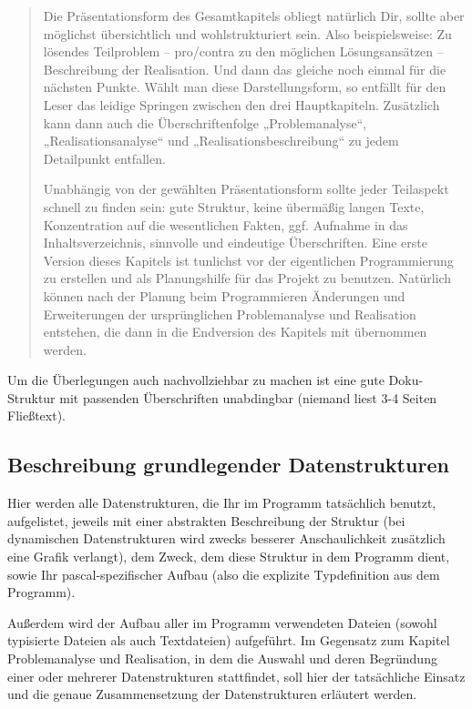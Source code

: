 \documentclass[12pt, letterpaper, twoside]{article}
\begin{document}
\begin{verse}
                    \item Die Präsentationsform des Gesamtkapitels obliegt natürlich Dir, sollte aber möglichst übersichtlich und wohlstrukturiert sein. Also beispielsweise: Zu lösendes Teilproblem – pro/contra zu den möglichen Lösungsansätzen – Beschreibung der Realisation. Und dann das gleiche noch einmal für die nächsten Punkte. Wählt man diese Darstellungsform, so entfällt für den Leser das leidige Springen zwischen den drei Hauptkapiteln. Zusätzlich kann dann auch die Überschriftenfolge „Problemanalyse“, „Realisationsanalyse“ und „Realisationsbeschreibung“ zu jedem Detailpunkt entfallen.

                    \item Unabhängig von der gewählten Präsentationsform sollte jeder Teilaspekt schnell zu finden sein: gute Struktur, keine übermäßig langen Texte, Konzentration auf die wesentlichen Fakten, ggf. Aufnahme in das Inhaltsverzeichnis, sinnvolle und eindeutige Überschriften. Eine erste Version dieses Kapitels ist tunlichst vor der eigentlichen Programmierung zu erstellen und als Planungshilfe für das Projekt zu benutzen. Natürlich können nach der Planung beim Programmieren Änderungen und Erweiterungen der ursprünglichen Problemanalyse und Realisation entstehen, die dann in die Endversion des Kapitels mit übernommen werden.
            \end{verse}
            Um die Überlegungen auch nachvollziehbar zu machen ist eine gute Doku-Struktur mit passenden Überschriften unabdingbar (niemand liest 3-4 Seiten Fließtext).
        
        \subsection{Beschreibung grundlegender Datenstrukturen}
            Hier werden alle Datenstrukturen, die Ihr im Programm tatsächlich benutzt, aufgelistet, jeweils mit einer abstrakten Beschreibung der Struktur (bei dynamischen Datenstrukturen wird zwecks besserer Anschaulichkeit zusätzlich eine Grafik verlangt), dem Zweck, dem diese Struktur in dem Programm dient, sowie Ihr pascal-spezifischer Aufbau (also die explizite Typdefinition aus dem Programm). 
            
            Außerdem wird der Aufbau aller im Programm verwendeten Dateien (sowohl typisierte Dateien als auch Textdateien) aufgeführt. Im Gegensatz zum Kapitel Problemanalyse und Realisation, in dem die Auswahl und deren Begründung einer oder mehrerer Datenstrukturen stattfindet, soll hier der tatsächliche Einsatz und die genaue Zusammensetzung der Datenstrukturen erläutert werden.
        
\end{document}

